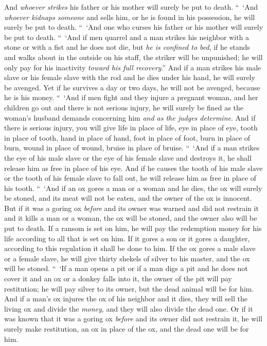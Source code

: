 \begin{biblechapter}
\verse And \textit{whoever strikes} his father or his mother will surely be put to death.
\verse “ ‘And \textit{whoever kidnaps someone} and sells him, or he is found in his possession, he will surely be put to death.
\verse “ ‘And one who curses his father or his mother will surely be put to death.
\verse “ ‘And if men quarrel and a man strikes his neighbor with a stone or with a fist and he does not die, but \textit{he is confined to bed},
\verse if he stands and walks about in the outside on his staff, the striker will be unpunished; he will only pay for his inactivity \textit{toward his full recovery}.”
\verse And if a man strikes his male slave or his female slave with the rod and he dies under his hand, he will surely be avenged.
\verse Yet if he survives a day or two days, he will not be avenged, because he is his money.
\verse “ ‘And if men fight and they injure a pregnant woman, and her children go out and there is not serious injury, he will surely be fined as the woman’s husband demands concerning him \textit{and as the judges determine}.
\verse And if there is serious injury, you will give life in place of life,
\verse eye in place of eye, tooth in place of tooth, hand in place of hand, foot in place of foot,
\verse burn in place of burn, wound in place of wound, bruise in place of bruise.
\verse “ ‘And if a man strikes the eye of his male slave or the eye of his female slave and destroys it, he shall release him as free in place of his eye.
\verse And if he causes the tooth of his male slave or the tooth of his female slave to fall out, he will release him as free in place of his tooth.
\verse “ ‘And if an ox gores a man or a woman and he dies, the ox will surely be stoned, and its meat will not be eaten, and the owner of the ox is innocent.
\verse But if it was a goring ox \textit{before} and its owner was warned and did not restrain it and it kills a man or a woman, the ox will be stoned, and the owner also will be put to death.
\verse If a ransom is set on him, he will pay the redemption money for his life according to all that is set on him.
\verse If it gores a son or it gores a daughter, according to this regulation it shall be done to him.
\verse If the ox gores a male slave or a female slave, he will give thirty shekels of silver to his master, and the ox will be stoned.
\verse “ ‘If a man opens a pit or if a man digs a pit and he does not cover it and an ox or a donkey falls into it,
\verse the owner of the pit will pay restitution; he will pay silver to its owner, but the dead animal will be for him.
\verse And if a man’s ox injures the ox of his neighbor and it dies, they will sell the living ox and divide the \textit{money}, and they will also divide the dead one.
\verse Or if it was known that it was a goring ox \textit{before} and its owner did not restrain it, he will surely make restitution, an ox in place of the ox, and the dead one will be for him.
\end{biblechapter}

